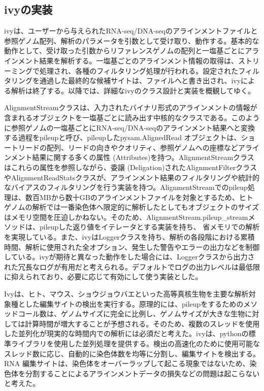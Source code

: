 \subsection{ivyの実装}
ivyは、ユーザーから与えられたRNA-seq/DNA-seqのアラインメントファイルと参照ゲノム配列、解析のパラメータを引数として受け取り、動作する。基本的な動作として、受け取った引数からリファレンスゲノムの配列と一塩基ごとにアラインメント結果を解析する。一塩基ごとのアラインメント情報の取得は、ストリーミングで処理され、各種のフィルタリング処理が行われる。設定されたフィルタリングを通過した最終的な候補サイトは、ファイルへと書き出され、ivyによる解析は終了する。以降では、詳細なivyのクラス設計と実装を概観してゆく。
\par
AlignmentStreamクラスは、入力されたバイナリ形式のアラインメントの情報が含まれるオブジェクトを一塩基ごとに読み出す中核的なクラスである。このように参照ゲノムの一塩基ごとにRNA-seq/DNA-seqのアラインメント結果へと変換する過程をpileupと呼び、pileupしたpysam.AlignedRead
オブジェクトは、ショートリードの配列、リードの向きやクオリティ、参照ゲノムへの座標などアラインメント結果に関する多くの属性 (Attributes)を持つ。AlignmentStreamクラスはこれらの属性を参照しながら、委譲 (Deligation)されたAlignmentFilterクラスやAlignmentReadStatsクラスが、アラインメント結果のフィルタリングや統計的なバイアスのフィルタリングを行う実装を持つ。AlignmentStreamでのpileup処理は、数百MBから数十GBのアラインメントファイルを対象とするため、ヒトゲノムの解析では一番染色体へ限定的に解析したとしてもオブジェクトのサイズはメモリ空間を圧迫しかねない。そのため、AlignmentStream.pileup\_streamメソッドは、pileupした返り値をイテレータとする実装を持ち、
省メモリでの解析を実現している。また、ivyはLoggerクラスを持ち、解析の各段階における累積時間、解析に使用された全オプション、発生した警告やエラーの出力などを制御している。ivyが期待と異なった動作をした場合には、Loggerクラスから出力された冗長なログが有用だと考えられる。デフォルトでログの出力レベルは最低限に抑えられており、必要に応じて有効にして使う実装とした。
\par
Ivyは、ヒト、マウス、ショウジョウバエといった高等真核生物を主要な解析対象種とした編集サイトの検出を実行する。原理的には、pileupをするためのメソッドコール数は、ゲノムサイズに完全に比例し、ゲノムサイズが大きな生物に対しては計算時間が増大することが予想される。そのため、複数のスレッドを使用した並列化が現実的な時間内での解析には必須だと考えた。ivyは、pythonの標準ライブラリを使用した並列処理を提供する。検出の高速化のために使用可能なスレッド数に応じ、自動的に染色体数を均等に分割し、編集サイトを検出する。RNA 編集サイトは、染色体をオーバーラップして起こる現象ではないため、染色体を分割することによるアラインメントデータの損失などの問題は起こらないと考えた。

